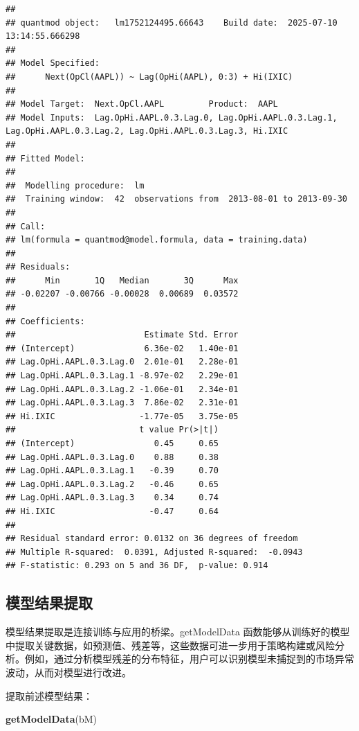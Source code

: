 \documentclass[]{ctexbook}
\newenvironment{Shaded}{\begin{snugshade}}{\end{snugshade}}
\newcommand{\FunctionTok}[1]{\textcolor[rgb]{0.13,0.29,0.53}{\textbf{#1}}}
\newcommand{\NormalTok}[1]{#1}
\begin{document}
\begin{verbatim}
## 
## quantmod object:   lm1752124495.66643    Build date:  2025-07-10 13:14:55.666298 
## 
## Model Specified: 
##      Next(OpCl(AAPL)) ~ Lag(OpHi(AAPL), 0:3) + Hi(IXIC) 
## 
## Model Target:  Next.OpCl.AAPL         Product:  AAPL 
## Model Inputs:  Lag.OpHi.AAPL.0.3.Lag.0, Lag.OpHi.AAPL.0.3.Lag.1, Lag.OpHi.AAPL.0.3.Lag.2, Lag.OpHi.AAPL.0.3.Lag.3, Hi.IXIC 
## 
## Fitted Model: 
## 
##  Modelling procedure:  lm 
##  Training window:  42  observations from  2013-08-01 to 2013-09-30
## 
## Call:
## lm(formula = quantmod@model.formula, data = training.data)
## 
## Residuals:
##      Min       1Q   Median       3Q      Max 
## -0.02207 -0.00766 -0.00028  0.00689  0.03572 
## 
## Coefficients:
##                          Estimate Std. Error
## (Intercept)              6.36e-02   1.40e-01
## Lag.OpHi.AAPL.0.3.Lag.0  2.01e-01   2.28e-01
## Lag.OpHi.AAPL.0.3.Lag.1 -8.97e-02   2.29e-01
## Lag.OpHi.AAPL.0.3.Lag.2 -1.06e-01   2.34e-01
## Lag.OpHi.AAPL.0.3.Lag.3  7.86e-02   2.31e-01
## Hi.IXIC                 -1.77e-05   3.75e-05
##                         t value Pr(>|t|)
## (Intercept)                0.45     0.65
## Lag.OpHi.AAPL.0.3.Lag.0    0.88     0.38
## Lag.OpHi.AAPL.0.3.Lag.1   -0.39     0.70
## Lag.OpHi.AAPL.0.3.Lag.2   -0.46     0.65
## Lag.OpHi.AAPL.0.3.Lag.3    0.34     0.74
## Hi.IXIC                   -0.47     0.64
## 
## Residual standard error: 0.0132 on 36 degrees of freedom
## Multiple R-squared:  0.0391, Adjusted R-squared:  -0.0943 
## F-statistic: 0.293 on 5 and 36 DF,  p-value: 0.914
\end{verbatim}

\subsection{模型结果提取}\label{ux6a21ux578bux7ed3ux679cux63d0ux53d6}

模型结果提取是连接训练与应用的桥梁。getModelData 函数能够从训练好的模型中提取关键数据，如预测值、残差等，这些数据可进一步用于策略构建或风险分析。例如，通过分析模型残差的分布特征，用户可以识别模型未捕捉到的市场异常波动，从而对模型进行改进。

提取前述模型结果：

\begin{Shaded}
\begin{Highlighting}[]
\FunctionTok{getModelData}\NormalTok{(bM)}
\end{Highlighting}
\end{Shaded}
\end{document}
